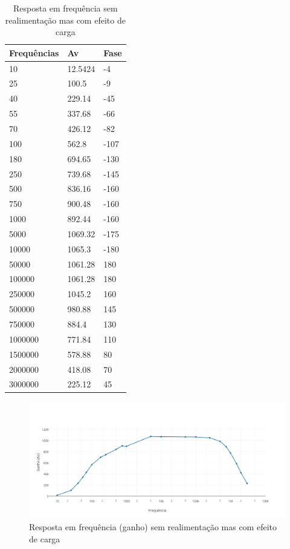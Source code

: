 \documentclass[openright]{normas-utf-tex} %
\begin{document}
\begin{table}[H]
\centering
\caption{Resposta em frequência sem realimentação mas com efeito de carga}
\label{tab:resp_freq_sem_realimentacao}
\begin{tabular}{ | l | l | l | }
\hline
	Frequências & Av & Fase \\ \hline
	10 & 12.5424 & -4 \\ \hline
	25 & 100.5 & -9 \\ \hline
	40 & 229.14 & -45 \\ \hline
	55 & 337.68 & -66 \\ \hline
	70 & 426.12 & -82 \\ \hline
	100 & 562.8 & -107 \\ \hline
	180 & 694.65 & -130 \\ \hline
	250 & 739.68 & -145 \\ \hline
	500 & 836.16 & -160 \\ \hline
	750 & 900.48 & -160 \\ \hline
	1000 & 892.44 & -160 \\ \hline
	5000 & 1069.32 & -175 \\ \hline
	10000 & 1065.3 & -180 \\ \hline
	50000 & 1061.28 & 180 \\ \hline
	100000 & 1061.28 & 180 \\ \hline
	250000 & 1045.2 & 160 \\ \hline
	500000 & 980.88 & 145 \\ \hline
	750000 & 884.4 & 130 \\ \hline
	1000000 & 771.84 & 110 \\ \hline
	1500000 & 578.88 & 80 \\ \hline
	2000000 & 418.08 & 70 \\ \hline
	3000000 & 225.12 & 45 \\ \hline
\end{tabular}
\end{table}

\begin{figure}[H]
\centering
\includegraphics[width=0.8\linewidth]{img/Projeto2_SemRealimentac_a_o.png}
\caption{Resposta em frequência (ganho) sem realimentação mas com efeito de carga}
\label{fig:resp_freq_sem_real_fase}
\end{figure}
\end{document}
